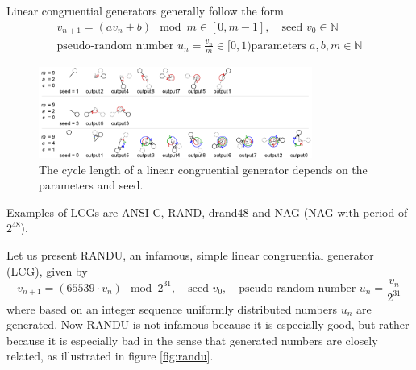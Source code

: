 Linear congruential generators generally follow the form
\begin{equation}
    \begin{gathered}
        v_{n+1} = (a v_n + b) \mod m \in [0, m - 1], \quad \text{seed } v_0  \in \mathbb{N} \\ \text{pseudo-random number } u_n = \frac{v_n}{m} \in [0,1)
        \text{parameters } a, b, m \in \mathbb{N}
    \end{gathered}
\end{equation}

\begin{figure}[H]
    \centering
    \includegraphics[width=0.8\textwidth]{figures/lcg.pdf}
    \caption{The cycle length of a linear congruential generator depends on the parameters and seed.}
    \label{fig:lcg}
\end{figure}

Examples of LCGs are ANSI-C, RAND, drand48 and NAG (NAG with period of $2^{48}$).


Let us present RANDU, an infamous, simple linear congruential generator (LCG), given by
\begin{equation}
    v_{n+1} = (65539 \cdot v_n) \mod 2^{31}, \quad \text{seed } v_0, \quad \text{pseudo-random number } u_n = \frac{v_n}{2^{31}}
\end{equation}
where based on an integer sequence uniformly distributed numbers $u_n$ are generated. Now RANDU is not infamous because it is especially good, but rather
because it is especially bad in the sense that generated numbers are closely related, as illustrated in figure \ref{fig:randu}.

